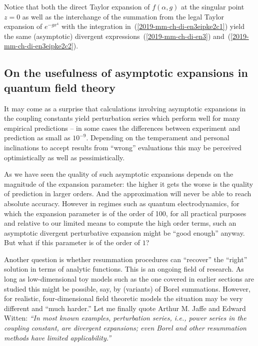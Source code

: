 Notice that both the direct Taylor expansion of $f(\alpha,g)$ at the singular point $z=0$ as well as the
interchange of the summation from the legal Taylor expansion of $e^{-gx^{4}}$ with the integration in~(\ref{2019-mm-ch-di-en3eipke2c1})
yield the same (asymptotic) divergent expressions~(\ref{2019-mm-ch-di-en3})
and~(\ref{2019-mm-ch-di-en3eipke2c2}).



\subsection{On the usefulness of asymptotic expansions in quantum field theory}

It may come as a surprise that calculations involving asymptotic expansions in the coupling constants yield perturbation series
which perform well for many empirical predictions -- in some cases\cite[-30mm]{HAGIWARA2007173}
the differences between experiment and prediction as small as $10^{-9}$.
Depending on the temperament and personal inclinations to accept results from ``wrong'' evaluations
this may be perceived optimistically as well as pessimistically.

As we have seen the quality of such asymptotic expansions depends on the magnitude of the expansion parameter:
the higher it gets the worse is the quality of prediction in larger orders.
And the approximation will never be able to reach absolute accuracy.
However in regimes such as quantum electrodynamics,
for which the expansion parameter is of the order of 100, for all practical purposes\cite[-30mm]{bell-a}
and relative to our limited  means to compute the high order terms,
such an asymptotic divergent perturbative expansion
might be ``good enough'' anyway.
But what if this parameter is of the order of $1$?

Another question is whether resummation procedures can ``recover'' the ``right'' solution in terms of analytic functions.
This is an ongoing field of research. As long as low-dimensional toy models such as
the one covered in earlier sections are studied this might be possible, say, by (variants) of Borel summations.\cite[-45mm]{Sauzin-2014,Mas-2019}
However, for realistic, four-dimensional field theoretic models the situation may be very different and ``much harder.''\cite[-25mm]{ZINNJUSTIN20101454,neumaier-sum}
Let me finally quote Arthur M. Jaffe and Edward Witten:\cite{Jaffe-Witten-2000-QYMT}
{\em ``In most known examples, perturbation series,
i.e., power series in the coupling constant, are divergent expansions; even Borel and
other resummation methods have limited applicability.''}







